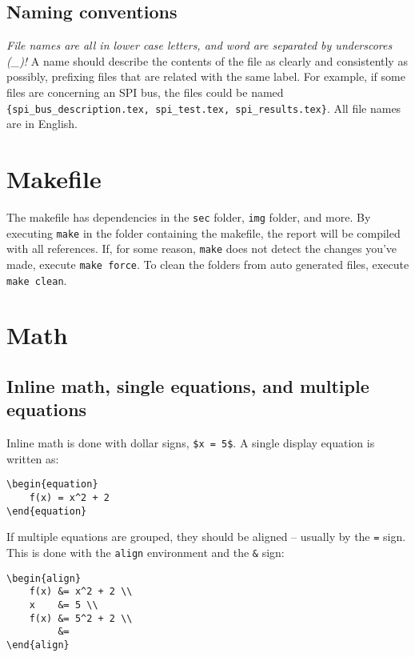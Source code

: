 \subsection{Naming conventions}
\emph{File names are all in lower case letters, and word are separated by underscores (\_)!} A name should describe the contents of the file as clearly and consistently as possibly, prefixing files that are related with the same label. For example, if some files are concerning an SPI bus, the files could be named \texttt{\{spi\_bus\_description.tex, spi\_test.tex, spi\_results.tex\}}. All file names are in English.


\section{Makefile} 
\label{sec:makefile}
The makefile has dependencies in the \texttt{sec} folder, \texttt{img} folder, and more. By executing \texttt{make} in the folder containing the makefile, the report will be compiled with all references. If, for some reason, \texttt{make} does not detect the changes you've made, execute \texttt{make force}. To clean the folders from auto generated files, execute \texttt{make clean}.


\section{Math}
\label{sec:math}
\subsection{Inline math, single equations, and multiple equations}
Inline math is done with dollar signs, \texttt{\$x = 5\$}. A single display equation is written as:
\begin{verbatim}
\begin{equation}
    f(x) = x^2 + 2
\end{equation}
\end{verbatim}
If multiple equations are grouped, they should be aligned -- usually by the \texttt{=} sign. This is done with the \texttt{align} environment and the \texttt{\&} sign:
\begin{verbatim}
\begin{align}
    f(x) &= x^2 + 2 \\
    x    &= 5 \\
    f(x) &= 5^2 + 2 \\
         &= 
\end{align}
\end{verbatim}


